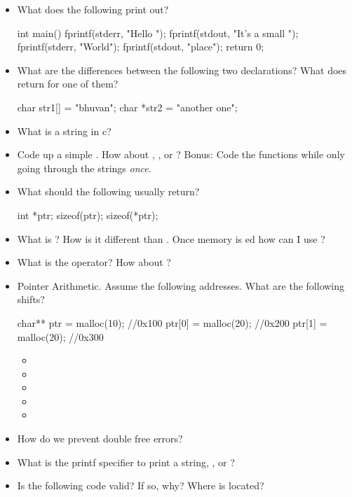 \begin{itemize}
\item
  What does the following print out?

\begin{code}[language=C]
int main(){
fprintf(stderr, "Hello ");
fprintf(stdout, "It's a small ");
fprintf(stderr, "World\n");
fprintf(stdout, "place\n");
return 0;
}
\end{code}
\item
  What are the differences between the following two declarations? What
  does  return for one of them?

\begin{code}[language=C]
char str1[] = "bhuvan";
char *str2 = "another one";
\end{code}
\item
  What is a string in c?
\item
  Code up a simple . How about ,
  , or ? Bonus: Code the functions
  while only going through the strings \emph{once}.
\item
  What should the following usually return?

\begin{code}[language=C]
int *ptr;
sizeof(ptr);
sizeof(*ptr);
\end{code}
\item
  What is ? How is it different than .
  Once memory is ed how can I use ?
\item
  What is the \keyword{\&} operator? How about \keyword{*}?
\item
  Pointer Arithmetic. Assume the following addresses. What are the
  following shifts?

\begin{code}[language=C]
char** ptr = malloc(10); //0x100
ptr[0] = malloc(20); //0x200
ptr[1] = malloc(20); //0x300
\end{code}

  \begin{itemize}
  \tightlist
  \item
  \item
  \item
  \item
  \item
  \end{itemize}
\item
  How do we prevent double free errors?
\item
  What is the printf specifier to print a string, , or
  ?
\item
  Is the following code valid? If so, why? Where is 
  located?


\end{itemize}
